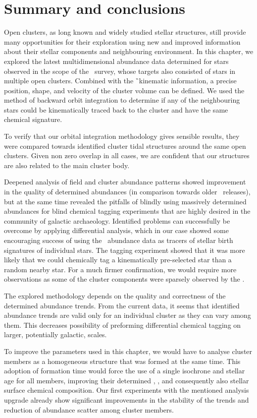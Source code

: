 \section{Summary and conclusions}
\label{sec:clusters_summary_conclusions}
Open clusters, as long known and widely studied stellar structures, still provide many opportunities for their exploration using new and improved information about their stellar components and neighbouring environment. In this chapter, we explored the latest multidimensional abundance data determined for stars observed in the scope of the \Gh\ survey, whose targets also consisted of stars in multiple open clusters. Combined with the \G\ kinematic information, a precise position, shape, and velocity of the cluster volume can be defined. We used the method of backward orbit integration to determine if any of the neighbouring stars could be kinematically traced back to the cluster and have the same chemical signature.

To verify that our orbital integration methodology gives sensible results, they were compared towards identified cluster tidal structures around the same open clusters. Given non zero overlap in all cases, we are confident that our structures are also related to the main cluster body.

Deepened analysis of field and cluster abundance patterns showed improvement in the quality of determined abundances (in comparison towards older \Gh\ releases), but at the same time revealed the pitfalls of blindly using massively determined abundances for blind chemical tagging experiments that are highly desired in the community of galactic archaeology. Identified problems can successfully be overcome by applying differential analysis, which in our case showed some encouraging success of using the \Gh\ abundance data as tracers of stellar birth signatures of individual stars. The tagging experiment showed that it was more likely that we could chemically tag a kinematically pre-selected star than a random nearby star. For a much firmer confirmation, we would require more observations as some of the cluster components were sparsely observed by the \Gh.

The explored methodology depends on the quality and correctness of the determined abundance trends. From the current data, it seems that identified abundance trends are valid only for an individual cluster as they can vary among them. This decreases possibility of preforming differential chemical tagging on larger, potentially galactic, scales.

To improve the parameters used in this chapter, we would have to analyse cluster members as a homogeneous structure that was formed at the same time. This adoption of formation time would force the use of a single isochrone and stellar age for all members, improving their determined \Logg, \Feh, and consequently also stellar surface chemical composition. Our first experiments with the mentioned analysis upgrade already show significant improvements in the stability of the trends and reduction of abundance scatter among cluster members.